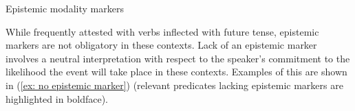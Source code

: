 \ea\label{ex: epistemic modality markers}
{Epistemic modality markers }

    \label{ex: epistemic modality markersa}
        \label{ex: epistemic modality markersb}
    \z
\z


While frequently attested with verbs inflected with future tense, epistemic markers are not obligatory in these contexts. Lack of an epistemic marker involves a neutral interpretation with respect to the speaker’s commitment to the likelihood the event will take place in these contexts. Examples of this are shown in (\ref{ex: no epistemic marker}) (relevant predicates lacking epistemic markers are highlighted in boldface).

\ea\label{ex: no epistemic marker}

